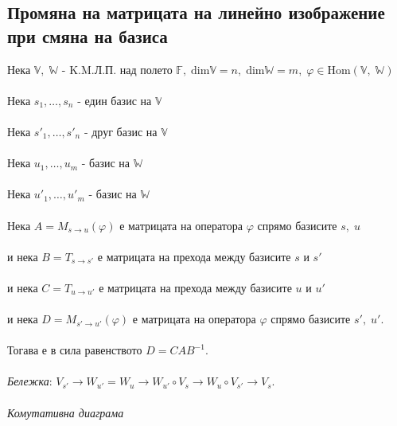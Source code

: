 \documentclass{article}
\newcommand{\V}{\mathbb{V}}
\newcommand{\F}{\mathbb{F}}
\newcommand{\W}{\mathbb{W}}
\newcommand{\n}[1]{#1_1, \dots, #1_n}
\newcommand{\m}[1]{#1_1, \dots, #1_m}
\begin{document}
    \subsection{Промяна на матрицата на линейно изображение при смяна на базиса}
    Нека \(\V, \; \W\) - K.M.Л.П. над полето \(\F, \; \mathrm{dim}\V = n, \; \mathrm{dim}\W = m, \; \varphi \in \mathrm{Hom}(\V, \; \W)\) \\\\
    Нека \(\n{s}\) - един базис на \(\V\) \\\\
    Нека \(\n{s'}\) - друг базис на \(\V\) \\\\
    Нека \(\m{u}\) - базис на \(\W\) \\\\
    Нека \(\m{u'}\) - базис на \(\W\) \\\\
    Нека \(A = M_{s \to u}(\varphi)\) е матрицата на оператора \(\varphi\) спрямо базисите \(s, \; u\) \\\\
    и нека \(B = T_{s \to s'}\) е матрицата на прехода между базисите \(s\) и \(s'\) \\\\
    и нека \(C = T_{u \to u'}\) е матрицата на прехода между базисите \(u\) и \(u'\) \\\\
    и нека \(D = M_{s' \to u'}(\varphi)\) е матрицата на оператора \(\varphi\) спрямо базисите \(s', \; u'\). \\\\
    Тогава е в сила равенството \(D = CAB^{-1}\). \\\\
    \textit{Бележка}: \(V_{s'} \to W_{u'} = W_{u} \to W_{u'} \circ V_s \to W_u \circ V_{s'} \to V_s\). \\\\
    \textit{Комутативна диаграма} \\\\
\end{document}
